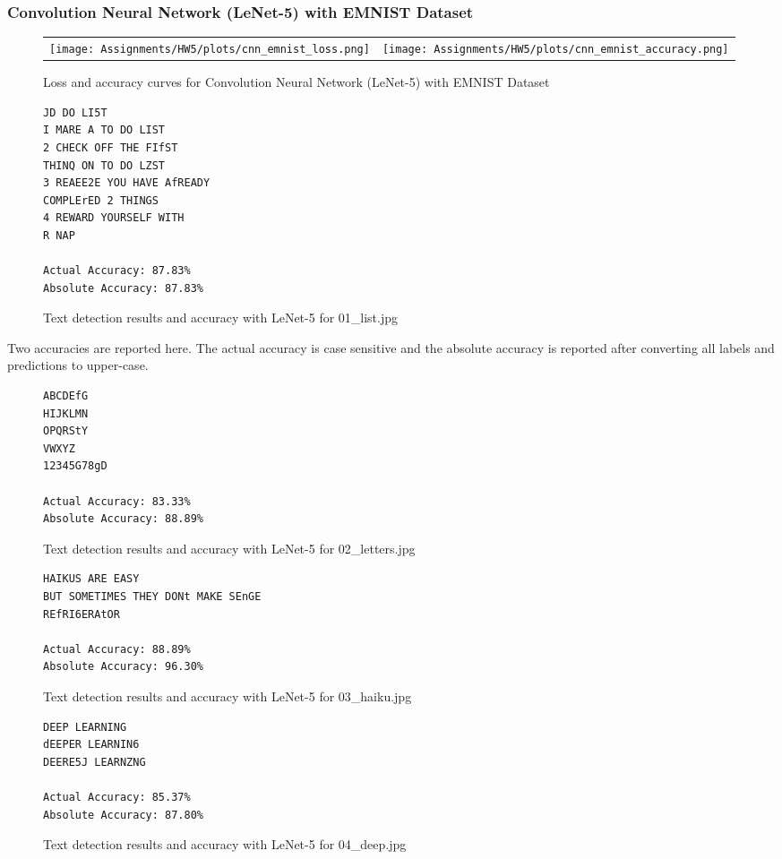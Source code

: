 \documentclass[a4paper]{article}
\begin{document}
\subsubsection{Convolution Neural Network (LeNet-5) with EMNIST Dataset}
\begin{figure}[!ht]
\centering
\begin{tabular}{cc}
{\texttt{[image: Assignments/HW5/plots/cnn\_emnist\_loss.png]}} &
{\texttt{[image: Assignments/HW5/plots/cnn\_emnist\_accuracy.png]}}
\end{tabular}
\caption{Loss and accuracy curves for Convolution Neural Network (LeNet-5) with EMNIST Dataset}
\end{figure}

\begin{figure}[!ht]
\centering
\begin{BVerbatim}
JD DO LI5T
I MARE A TO DO LIST
2 CHECK OFF THE FIfST
THINQ ON TO DO LZST
3 REAEE2E YOU HAVE AfREADY
COMPLErED 2 THINGS
4 REWARD YOURSELF WITH
R NAP

Actual Accuracy: 87.83%
Absolute Accuracy: 87.83%
\end{BVerbatim}
\caption{Text detection results and accuracy with LeNet-5 for 01\_list.jpg}
\end{figure}

Two accuracies are reported here. The actual accuracy is case sensitive and the absolute accuracy is reported after converting all labels and predictions to upper-case.

\begin{figure}[!ht]
\centering
\begin{BVerbatim}
ABCDEfG
HIJKLMN
OPQRStY
VWXYZ
12345G78gD

Actual Accuracy: 83.33%
Absolute Accuracy: 88.89%
\end{BVerbatim}
\caption{Text detection results and accuracy with LeNet-5 for 02\_letters.jpg}
\end{figure}

\begin{figure}[!ht]
\centering
\begin{BVerbatim}
HAIKUS ARE EASY
BUT SOMETIMES THEY DONt MAKE SEnGE
REfRI6ERAtOR

Actual Accuracy: 88.89%
Absolute Accuracy: 96.30%
\end{BVerbatim}
\caption{Text detection results and accuracy with LeNet-5 for 03\_haiku.jpg}
\end{figure}

\begin{figure}[!ht]
\centering
\begin{BVerbatim}
DEEP LEARNING
dEEPER LEARNIN6
DEERE5J LEARNZNG

Actual Accuracy: 85.37%
Absolute Accuracy: 87.80%
\end{BVerbatim}
\caption{Text detection results and accuracy with LeNet-5 for 04\_deep.jpg}
\end{figure}
\end{document}
